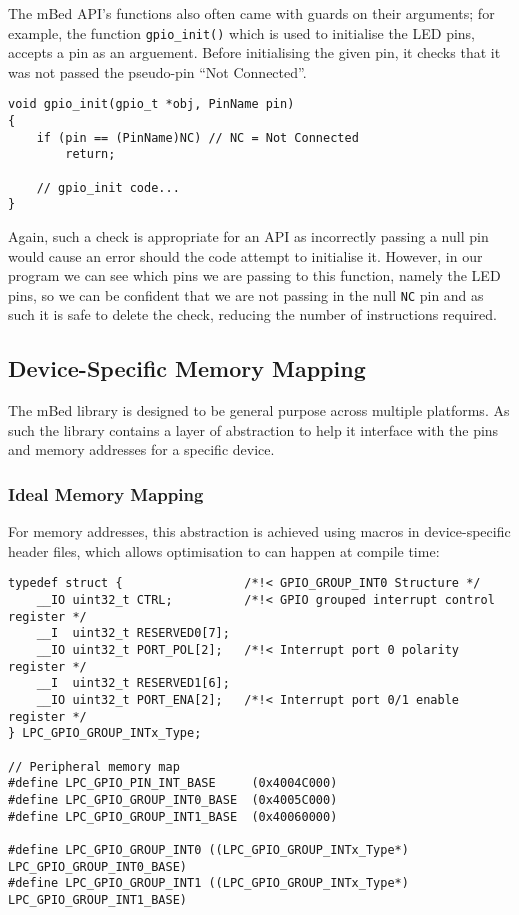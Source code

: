 The mBed API's functions also often came with guards on their arguments; for example, the function \verb|gpio_init()| which is used to initialise the LED pins, accepts a pin as an arguement. Before initialising the given pin, it checks that it was not passed the pseudo-pin ``Not Connected''.

\begin{lstlisting}[caption={Argument Guards of gpio init}]
void gpio_init(gpio_t *obj, PinName pin)
{
    if (pin == (PinName)NC) // NC = Not Connected
        return;

    // gpio_init code...
}
\end{lstlisting}

Again, such a check is appropriate for an API as incorrectly passing a null pin would cause an error should the code attempt to initialise it. However, in our program we can see which pins we are passing to this function, namely the LED pins, so we can be confident that we are not passing in the null \verb|NC| pin and as such it is safe to delete the check, reducing the number of instructions required.

\subsection{Device-Specific Memory Mapping}

The mBed library is designed to be general purpose across multiple platforms. As such the library contains a layer of abstraction to help it interface with the pins and memory addresses for a specific device.

\subsubsection{Ideal Memory Mapping}\label{section:constant-memory-map}

For memory addresses, this abstraction is achieved using macros in device-specific header files, which allows optimisation to can happen at compile time:

\begin{lstlisting}[caption={Memory spaces mapped in LPC11Uxx.h}]
typedef struct {                 /*!< GPIO_GROUP_INT0 Structure */
    __IO uint32_t CTRL;          /*!< GPIO grouped interrupt control register */
    __I  uint32_t RESERVED0[7];
    __IO uint32_t PORT_POL[2];   /*!< Interrupt port 0 polarity register */
    __I  uint32_t RESERVED1[6];
    __IO uint32_t PORT_ENA[2];   /*!< Interrupt port 0/1 enable register */
} LPC_GPIO_GROUP_INTx_Type;

// Peripheral memory map
#define LPC_GPIO_PIN_INT_BASE     (0x4004C000)
#define LPC_GPIO_GROUP_INT0_BASE  (0x4005C000)
#define LPC_GPIO_GROUP_INT1_BASE  (0x40060000)

#define LPC_GPIO_GROUP_INT0 ((LPC_GPIO_GROUP_INTx_Type*) LPC_GPIO_GROUP_INT0_BASE)
#define LPC_GPIO_GROUP_INT1 ((LPC_GPIO_GROUP_INTx_Type*) LPC_GPIO_GROUP_INT1_BASE)
\end{lstlisting}

